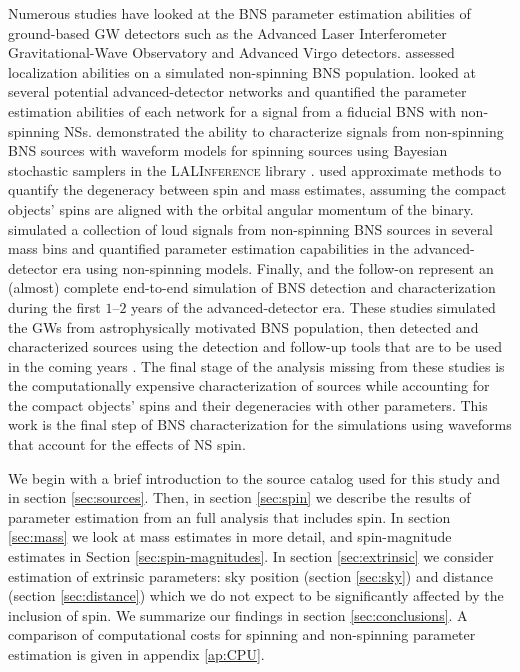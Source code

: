 Numerous studies have looked at the BNS parameter estimation abilities of ground-based GW detectors such as the Advanced Laser Interferometer Gravitational-Wave Observatory \citep[aLIGO;][]{Aasi_2015} and Advanced Virgo \citep[AdV;][]{Acernese_2014} detectors. \citet{Nissanke_2010,Nissanke_2011} assessed localization abilities on a simulated non-spinning BNS population. \citet{Veitch_2012} looked at several potential advanced-detector networks and quantified the parameter estimation abilities of each network for a signal from a fiducial BNS with non-spinning NSs. \citet{Aasi_2013} demonstrated the ability to characterize signals from non-spinning BNS sources with waveform models for spinning sources using Bayesian stochastic samplers in the \textsc{LALInference} library \citep{Veitch_2014}.  \citet{Hannam_2013} used approximate methods to quantify the degeneracy between spin and mass estimates, assuming the compact objects' spins are aligned with the orbital angular momentum of the binary. \citet{Rodriguez_2014} simulated a collection of loud signals from non-spinning BNS sources in several mass bins and quantified parameter estimation capabilities in the advanced-detector era using non-spinning models.  Finally, \citet{Singer_2014} and the follow-on \citet{Berry_2014} represent an (almost) complete end-to-end simulation of BNS detection and characterization during the first $1$--$2$ years of the advanced-detector era. These studies simulated the GWs from astrophysically motivated BNS population, then detected and characterized sources using the detection and follow-up tools that are to be used in the coming years \citep{undefined}.   The final stage of the analysis missing from these studies is the computationally expensive characterization of sources while accounting for the compact objects' spins and their degeneracies with other parameters.  This work is the final step of BNS characterization for the \citet{Singer_2014} simulations using waveforms that account for the effects of NS spin.

We begin with a brief introduction to the source catalog used for this study and \citet{Singer_2014} in section \ref{sec:sources}. Then, in section \ref{sec:spin} we describe the results of parameter estimation from an full analysis that includes spin. In section \ref{sec:mass} we look at mass estimates in more detail, and spin-magnitude estimates in Section \ref{sec:spin-magnitudes}. In section \ref{sec:extrinsic} we consider estimation of extrinsic parameters: sky position (section \ref{sec:sky}) and distance (section \ref{sec:distance}) which we do not expect to be significantly affected by the inclusion of spin. We summarize our findings in section \ref{sec:conclusions}. A comparison of computational costs for spinning and non-spinning parameter estimation is given in appendix \ref{ap:CPU}.

  
  